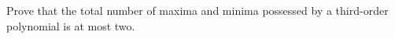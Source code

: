 Prove that the total number of maxima and minima possessed by a third-order polynomial
is at most two.
